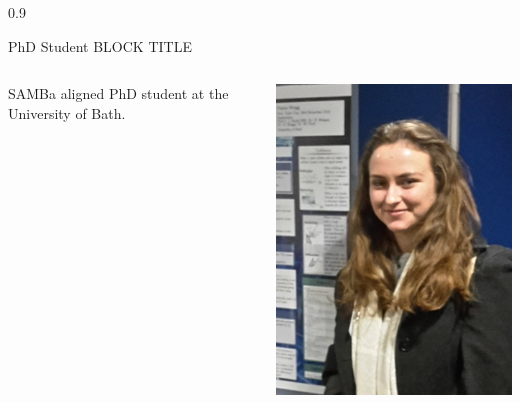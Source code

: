 \documentclass[final]{beamer}
\theoremstyle{plain}
\theoremstyle{definition}
\theoremstyle{remark}
\newlength{\onecolwid}
\begin{document}
\begin{frame}[t]
\begin{columns}[t]
\begin{column}{0.9\onecolwid}
\begin{alertblock}{PhD Student BLOCK TITLE}
\begin{columns}
\begin{column}{0.65\linewidth}
SAMBa aligned PhD student at the University of Bath.
\end{column}
\begin{column}{0.29\linewidth}
\includegraphics[scale=0.72]{HWragg.jpg} 
\end{column}
\end{columns}
\end{alertblock}
\vspace{1cm}


\end{column}
\end{columns}
\end{frame}
\end{document}
